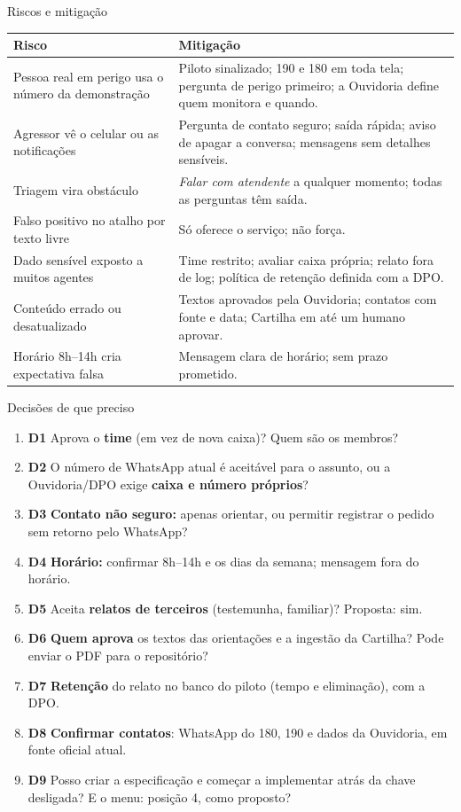 \documentclass[aspectratio=169,10pt]{beamer}
\newcommand{\code}[1]{\texttt{\detokenize{#1}}}
\begin{document}
\begin{frame}{Riscos e mitigação}
\scriptsize
\begin{tabularx}{\linewidth}{@{}>{\raggedright\arraybackslash}p{4.3cm}>{\raggedright\arraybackslash}X@{}}
\toprule
Risco & Mitigação \\
\midrule
Pessoa real em perigo usa o número da demonstração & Piloto sinalizado; 190 e 180 em toda tela; pergunta de perigo primeiro; a Ouvidoria define quem monitora e quando. \\
Agressor vê o celular ou as notificações & Pergunta de contato seguro; saída rápida; aviso de apagar a conversa; mensagens sem detalhes sensíveis. \\
Triagem vira obstáculo & \emph{Falar com atendente} a qualquer momento; todas as perguntas têm saída. \\
Falso positivo no atalho por texto livre & Só oferece o serviço; não força. \\
Dado sensível exposto a muitos agentes & Time restrito; avaliar caixa própria; relato fora de log; política de retenção definida com a DPO. \\
Conteúdo errado ou desatualizado & Textos aprovados pela Ouvidoria; contatos com fonte e data; Cartilha em \code{pending_review} até um humano aprovar. \\
Horário 8h--14h cria expectativa falsa & Mensagem clara de horário; sem prazo prometido. \\
\bottomrule
\end{tabularx}
\end{frame}

\begin{frame}{Decisões de que preciso}\label{pg:decisoes}
\small
\begin{enumerate}\setlength\itemsep{3pt}
  \item \textbf{D1} Aprova o \textbf{time} \code{ouvidoria da mulher} (em vez de nova caixa)? Quem são os membros?
  \item \textbf{D2} O número de WhatsApp atual é aceitável para o assunto, ou a Ouvidoria/DPO exige \textbf{caixa e número próprios}?
  \item \textbf{D3} \textbf{Contato não seguro:} apenas orientar, ou permitir registrar o pedido sem retorno pelo WhatsApp?
  \item \textbf{D4} \textbf{Horário:} confirmar 8h--14h e os dias da semana; mensagem fora do horário.
  \item \textbf{D5} Aceita \textbf{relatos de terceiros} (testemunha, familiar)? Proposta: sim.
  \item \textbf{D6} \textbf{Quem aprova} os textos das orientações e a ingestão da Cartilha? Pode enviar o PDF para o repositório?
  \item \textbf{D7} \textbf{Retenção} do relato no banco do piloto (tempo e eliminação), com a DPO.
  \item \textbf{D8} \textbf{Confirmar contatos}: WhatsApp do 180, 190 e dados da Ouvidoria, em fonte oficial atual.
  \item \textbf{D9} Posso criar a especificação e começar a implementar atrás da chave desligada? E o menu: posição 4, como proposto?
\end{enumerate}
\end{frame}
\end{document}
